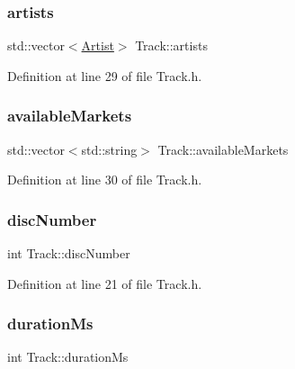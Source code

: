 \subsubsection{\texorpdfstring{artists}{artists}}
{\footnotesize\ttfamily std\+::vector$<$\mbox{\hyperlink{class_artist}{Artist}}$>$ Track\+::artists\hspace{0.3cm}{\ttfamily [private]}}



Definition at line 29 of file Track.\+h.

\mbox{\label{class_track_a10c873784726872d8360102f9a3d78d9}} 
\subsubsection{\texorpdfstring{available\+Markets}{availableMarkets}}
{\footnotesize\ttfamily std\+::vector$<$std\+::string$>$ Track\+::available\+Markets\hspace{0.3cm}{\ttfamily [private]}}



Definition at line 30 of file Track.\+h.

\mbox{\label{class_track_a8a03d7cc2a83a7c7e4637cf25262dcb9}} 
\subsubsection{\texorpdfstring{disc\+Number}{discNumber}}
{\footnotesize\ttfamily int Track\+::disc\+Number\hspace{0.3cm}{\ttfamily [private]}}



Definition at line 21 of file Track.\+h.

\mbox{\label{class_track_a12951180d03f23515f1023b21195f3d6}} 
\subsubsection{\texorpdfstring{duration\+Ms}{durationMs}}
{\footnotesize\ttfamily int Track\+::duration\+Ms\hspace{0.3cm}{\ttfamily [private]}}



